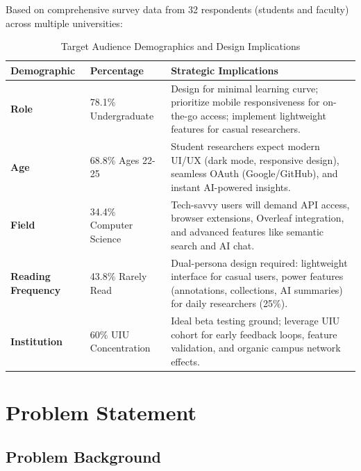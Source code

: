 Based on comprehensive survey data from 32 respondents (students and faculty) across multiple universities:

\begin{table}[H]
    \centering
    \small
    \begin{tabular}{|l|l|p{8cm}|}
        \hline
        \textbf{Demographic}       & \textbf{Percentage} & \textbf{Strategic Implications}                                                                          \\
        \hline
        \textbf{Role}              &
        78.1\% Undergraduate       &
        Design for minimal learning curve; prioritize mobile responsiveness for on-the-go access; implement lightweight features for casual researchers.            \\
        \hline
        \textbf{Age}               &
        68.8\% Ages 22-25          &
        Student researchers expect modern UI/UX (dark mode, responsive design), seamless OAuth (Google/GitHub), and instant AI-powered insights.                    \\
        \hline
        \textbf{Field}             &
        34.4\% Computer Science    &
        Tech-savvy users will demand API access, browser extensions, Overleaf integration, and advanced features like semantic search and AI chat.                  \\
        \hline
        \textbf{Reading Frequency} &
        43.8\% Rarely Read         &
        Dual-persona design required: lightweight interface for casual users, power features (annotations, collections, AI summaries) for daily researchers (25\%). \\
        \hline
        \textbf{Institution}       &
        60\% UIU Concentration     &
        Ideal beta testing ground; leverage UIU cohort for early feedback loops, feature validation, and organic campus network effects.                            \\
        \hline
    \end{tabular}
    \caption{Target Audience Demographics and Design Implications}
    \label{table:target-audience}
\end{table}

\section{Problem Statement}

\subsection{Problem Background}

